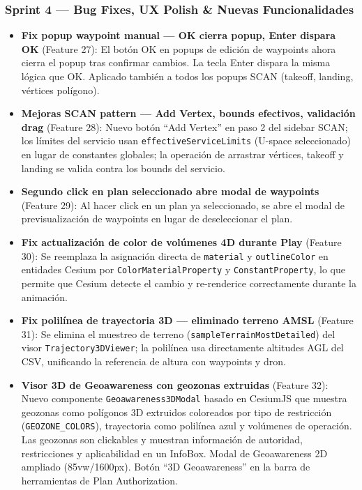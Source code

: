 \documentclass[12pt,a4paper]{article}
\begin{document}
\subsubsection*{Sprint 4 --- Bug Fixes, UX Polish \& Nuevas Funcionalidades}
\begin{itemize}
    \item \textbf{Fix popup waypoint manual --- OK cierra popup, Enter dispara OK} (Feature 27): El botón OK en popups de edición de waypoints ahora cierra el popup tras confirmar cambios. La tecla Enter dispara la misma lógica que OK. Aplicado también a todos los popups SCAN (takeoff, landing, vértices polígono).
    \item \textbf{Mejoras SCAN pattern --- Add Vertex, bounds efectivos, validación drag} (Feature 28): Nuevo botón ``Add Vertex'' en paso 2 del sidebar SCAN; los límites del servicio usan \texttt{effectiveServiceLimits} (U-space seleccionado) en lugar de constantes globales; la operación de arrastrar vértices, takeoff y landing se valida contra los bounds del servicio.
    \item \textbf{Segundo click en plan seleccionado abre modal de waypoints} (Feature 29): Al hacer click en un plan ya seleccionado, se abre el modal de previsualización de waypoints en lugar de deseleccionar el plan.
    \item \textbf{Fix actualización de color de volúmenes 4D durante Play} (Feature 30): Se reemplaza la asignación directa de \texttt{material} y \texttt{outlineColor} en entidades Cesium por \texttt{ColorMaterialProperty} y \texttt{ConstantProperty}, lo que permite que Cesium detecte el cambio y re-renderice correctamente durante la animación.
    \item \textbf{Fix polilínea de trayectoria 3D --- eliminado terreno AMSL} (Feature 31): Se elimina el muestreo de terreno (\texttt{sampleTerrainMostDetailed}) del visor \texttt{Trajectory3DViewer}; la polilínea usa directamente altitudes AGL del CSV, unificando la referencia de altura con waypoints y dron.
    \item \textbf{Visor 3D de Geoawareness con geozonas extruidas} (Feature 32): Nuevo componente \texttt{Geoawareness3DModal} basado en CesiumJS que muestra geozonas como polígonos 3D extruidos coloreados por tipo de restricción (\texttt{GEOZONE\_COLORS}), trayectoria como polilínea azul y volúmenes de operación. Las geozonas son clickables y muestran información de autoridad, restricciones y aplicabilidad en un InfoBox. Modal de Geoawareness 2D ampliado (85vw/1600px). Botón ``3D Geoawareness'' en la barra de herramientas de Plan Authorization.

\end{itemize}
\end{document}
